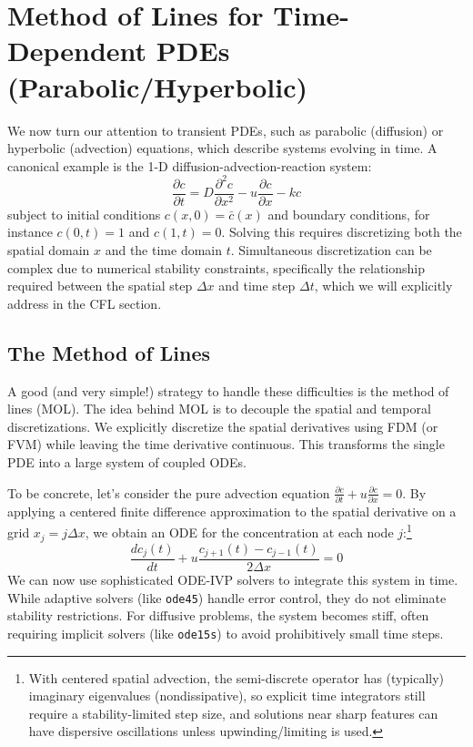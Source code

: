 \section{Method of Lines for Time-Dependent PDEs (Parabolic/Hyperbolic)}

We now turn our attention to transient PDEs, such as parabolic (diffusion) or hyperbolic (advection) equations, which describe systems evolving in time. A canonical example is the 1-D diffusion-advection-reaction system:
\begin{equation}
    \frac{\partial c}{\partial t} = D \frac{\partial^2 c}{\partial x^2} - u \frac{\partial c}{\partial x} - kc
\end{equation}
subject to initial conditions $c(x,0) = \bar{c}(x)$ and boundary conditions, for instance $c(0,t)=1$ and $c(1,t)=0$. Solving this requires discretizing both the spatial domain $x$ and the time domain $t$. Simultaneous discretization can be complex due to numerical stability constraints, specifically the relationship required between the spatial step $\Delta x$ and time step $\Delta t$, which we will explicitly address in the CFL section.

\subsection{The Method of Lines}

A good (and very simple!) strategy to handle these difficulties is the method of lines (MOL). The idea behind MOL is to decouple the spatial and temporal discretizations. We explicitly discretize the spatial derivatives using FDM (or FVM) while leaving the time derivative continuous. This transforms the single PDE into a large system of coupled ODEs.

To be concrete, let's consider the pure advection equation $\frac{\partial c}{\partial t} + u \frac{\partial c}{\partial x} = 0$. By applying a centered finite difference approximation to the spatial derivative on a grid $x_j = j\Delta x$, we obtain an ODE for the concentration at each node $j$:\footnote{With centered spatial advection, the semi-discrete operator has (typically) imaginary eigenvalues (nondissipative), so explicit time integrators still require a stability-limited step size, and solutions near sharp features can have dispersive oscillations unless upwinding/limiting is used.}
\begin{equation}
    \frac{dc_j(t)}{dt} + u \frac{c_{j+1}(t) - c_{j-1}(t)}{2\Delta x} = 0
\end{equation}
We can now use sophisticated ODE-IVP solvers to integrate this system in time. While adaptive solvers (like \texttt{ode45}) handle error control, they do not eliminate stability restrictions. For diffusive problems, the system becomes stiff, often requiring implicit solvers (like \texttt{ode15s}) to avoid prohibitively small time steps.


